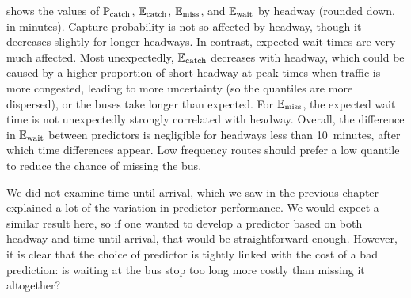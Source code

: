  shows the values of $\mathbb{P}_\text{catch}$, $\mathbb{E}_\text{catch}$, $\mathbb{E}_\text{miss}$, and $\mathbb{E}_\text{wait}$ by headway (rounded down, in minutes). Capture probability is not so affected by headway, though it decreases slightly for longer headways. In contrast, expected wait times are very much affected. Most unexpectedly, $\mathbb{E}_\text{catch}$ decreases with headway, which could be caused by a higher proportion of short headway at peak times when traffic is more congested, leading to more uncertainty (so the quantiles are more dispersed), or the buses take longer than expected. For $\mathbb{E}_\text{miss}$, the expected wait time is not unexpectedly strongly correlated with headway. Overall, the difference in $\mathbb{E}_\text{wait}$ between predictors is negligible for headways less than 10~minutes, after which time differences appear. Low frequency routes should prefer a low quantile to reduce the chance of missing the bus.


We did not examine time-until-arrival, which we saw in the previous chapter explained a lot of the variation in predictor performance. We would expect a similar result here, so if one wanted to develop a predictor based on both headway and time until arrival, that would be straightforward enough. However, it is clear that the choice of predictor is tightly linked with the cost of a bad prediction: is waiting at the bus stop too long more costly than missing it altogether?
